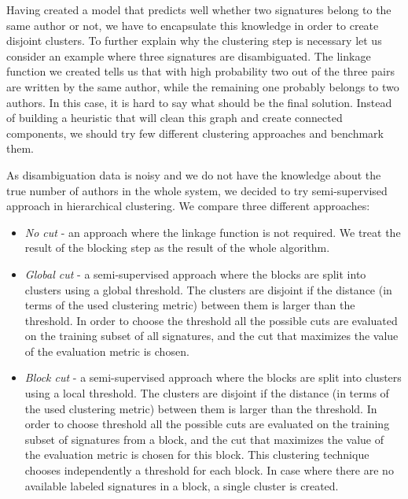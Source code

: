\documentclass{pracamgr}
\begin{document}
Having created a model that predicts well whether two signatures belong to the same
author or not, we have to encapsulate this knowledge in order to create disjoint
clusters. To further explain why the clustering step is necessary let us consider an
example where three signatures are disambiguated. The linkage function we created
tells us that with high probability two out of the three pairs are written by the same
author, while the remaining one probably belongs to two authors. In this case, it
is hard to say what should be the final solution. Instead of building a heuristic
that will clean this graph and create connected components, we should try few
different clustering approaches and benchmark them.

As disambiguation data is noisy and we do not have the knowledge about the true
number of authors in the whole system, we decided to try semi-supervised approach
in hierarchical clustering. We compare three different approaches:

\begin{itemize}
\item{\textit{No cut} - an approach where the linkage function is not required.
We treat the result of the blocking step as the result of the whole algorithm.}
\item{\textit{Global cut} - a semi-supervised approach where the blocks are split
into clusters using a global threshold. The clusters are disjoint if the distance
(in terms of the used clustering metric) between them is larger than the threshold.
In order to choose the threshold all the possible cuts are evaluated on the training
subset of all signatures, and the cut that maximizes the value of the evaluation
metric is chosen.}
\item{\textit{Block cut} - a semi-supervised approach where the blocks are split
into clusters using a local threshold. The clusters are disjoint if the distance
(in terms of the used clustering metric) between them is larger than the threshold.
In order to choose threshold all the possible cuts are evaluated on the training
subset of signatures from a block, and the cut that maximizes the value of the evaluation
metric is chosen for this block. This clustering technique chooses independently
a threshold for each block. In case where there are no available labeled signatures
in a block, a single cluster is created.}
\end{itemize}
\end{document}
